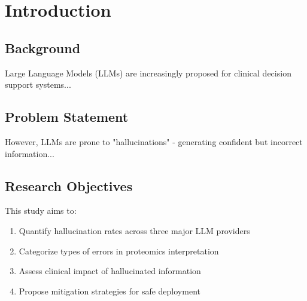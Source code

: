 \section{Introduction}

\subsection{Background}
Large Language Models (LLMs) are increasingly proposed for clinical decision support systems...

\subsection{Problem Statement}
However, LLMs are prone to "hallucinations" - generating confident but incorrect information...

\subsection{Research Objectives}
This study aims to:
\begin{enumerate}
    \item Quantify hallucination rates across three major LLM providers
    \item Categorize types of errors in proteomics interpretation
    \item Assess clinical impact of hallucinated information
    \item Propose mitigation strategies for safe deployment
\end{enumerate}
